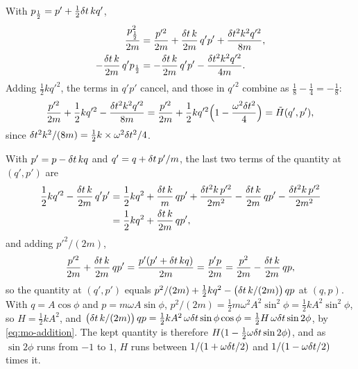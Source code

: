 With $p_{\frac12} = p' + \frac12\delta t\,kq'$,
\begin{align*}
   \frac{p_{\frac12}^2}{2m} &= \frac{p'^2}{2m} + \frac{\delta t\,k}{2m}\,q'p'
   + \frac{\delta t^2k^2q'^2}{8m} ,\\
   -\frac{\delta t\,k}{2m}\,q'p_{\frac12} &= -\frac{\delta t\,k}{2m}\,q'p'
   - \frac{\delta t^2k^2q'^2}{4m} .
\end{align*}
Adding $\frac12 kq'^2$, the terms in $q'p'$ cancel, and those in $q'^2$
combine as $\frac18 - \frac14 = -\frac18$:
\begin{equation*}
   \frac{p'^2}{2m} + \frac12 kq'^2 - \frac{\delta t^2k^2q'^2}{8m}
   = \frac{p'^2}{2m} + \frac12 kq'^2\Bigl(1 - \frac{\omega^2\delta t^2}{4}\Bigr)
   = \tilde{H}(q', p') ,
\end{equation*}
since $\delta t^2k^2/(8m) = \frac12 k\times\omega^2\delta t^2/4$.

With $p' = p - \delta t\,kq$ and $q' = q + \delta t\,
p'/m$, the last two terms of the quantity at $(q', p')$ are
\begin{align*}
   \frac12 kq'^2 - \frac{\delta t\,k}{2m}\,q'p'
   &= \frac12 kq^2 + \frac{\delta t\,k}{m}\,qp' + \frac{\delta t^2k\,p'^2}{2m^2}
   - \frac{\delta t\,k}{2m}\,qp' - \frac{\delta t^2k\,p'^2}{2m^2}\\
   &= \frac12 kq^2 + \frac{\delta t\,k}{2m}\,qp' ,
\end{align*}
and adding $p'^2/(2m)$,
\begin{equation*}
   \frac{p'^2}{2m} + \frac{\delta t\,k}{2m}\,qp' = \frac{p'(p' + \delta t\,kq)}{2m}
   = \frac{p'p}{2m} = \frac{p^2}{2m} - \frac{\delta t\,k}{2m}\,qp ,
\end{equation*}
so the quantity at $(q', p')$ equals $p^2/(2m) + \frac12 kq^2 - \bigl(\delta t
\,k/(2m)\bigr)\,qp$ at $(q, p)$. With $q = A\cos\phi$ and $p = m\omega
A\sin\phi$, $p^2/(2m) = \frac12 m\omega^2A^2\sin^2\phi = \frac12
kA^2\sin^2\phi$, so $H = \frac12 kA^2$, and $\bigl(\delta t\,k/(2m)\bigr)\,qp =
\frac12 kA^2\,\omega\delta t\sin\phi\cos\phi = \frac12 H\,\omega\delta t\sin2\phi$, by
\cref{eq:mo-addition}. The kept quantity is therefore $H(1 -
\frac12\omega\delta t\sin2\phi)$, and as $\sin2\phi$ runs from $-1$ to $1$, $H$
runs between $1/(1 + \omega\delta t/2)$ and $1/(1 - \omega\delta t/2)$ times it.

